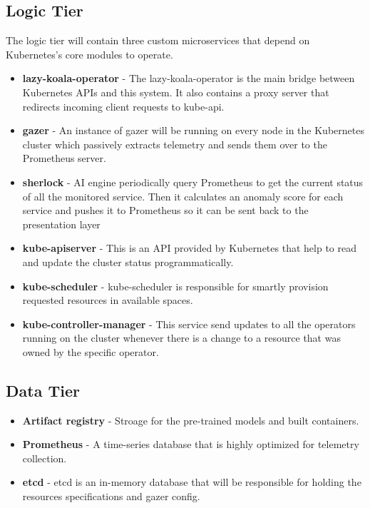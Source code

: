 \subsection{Logic Tier}

The logic tier will contain three custom microservices that depend on Kubernetes's core modules to operate.

\begin{itemize}[noitemsep,nolistsep] 
    \item \textbf{\ac{lazy-koala-operator}} - The \ac{lazy-koala-operator} is the main bridge between Kubernetes APIs and this system. It also contains a proxy server that redirects incoming client requests to kube-api.
    \item \textbf{\ac{gazer}} - An instance of \ac{gazer} will be running on every node in the Kubernetes cluster which passively extracts telemetry and sends them over to the Prometheus server.
    \item \textbf{\ac{sherlock}} - AI engine periodically query Prometheus to get the current status of all the monitored service. Then it calculates an anomaly score for each service and pushes it to Prometheus so it can be sent back to the presentation layer
    \item \textbf{kube-apiserver} - This is an API provided by Kubernetes that help to read and update the cluster status programmatically.
    \item \textbf{kube-scheduler} - kube-scheduler is responsible for smartly provision requested resources in available spaces.
    \item \textbf{kube-controller-manager} - This service send updates to all the operators running on the cluster whenever there is a change to a resource that was owned by the specific operator.
\end{itemize}

\subsection{Data Tier}

\begin{itemize}[noitemsep,nolistsep] 
    \item \textbf{Artifact registry} - Stroage for the pre-trained models and built containers.
    \item \textbf{Prometheus} - A time-series database that is highly optimized for telemetry collection.
    \item \textbf{etcd} - etcd is an in-memory database that will be responsible for holding the resources specifications and \ac{gazer} config.
\end{itemize}